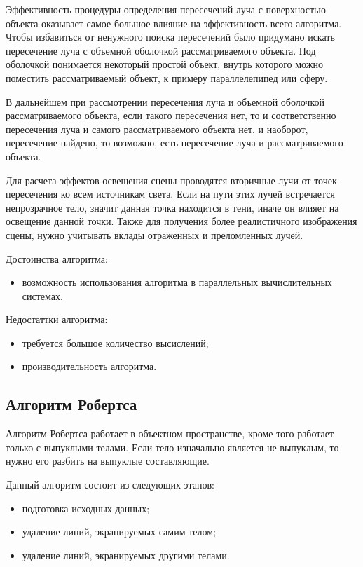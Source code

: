 Эффективность процедуры определения пересечений луча с поверхностью объекта оказывает самое большое влияние на эффективность всего алгоритма. Чтобы избавиться от ненужного поиска пересечений было придумано искать пересечение луча с объемной оболочкой рассматриваемого объекта. Под оболочкой понимается некоторый простой объект, внутрь которого можно поместить рассматриваемый объект, к примеру параллелепипед или сферу. 

В дальнейшем при рассмотрении пересечения луча и объемной оболочкой рассматриваемого объекта, если такого пересечения нет, то и соответственно пересечения луча и самого рассматриваемого объекта нет, и наоборот, пересечение найдено, то возможно, есть пересечение луча и рассматриваемого объекта. 

Для расчета эффектов освещения сцены проводятся вторичные лучи от точек пересечения ко всем источникам света. Если на пути этих лучей встречается непрозрачное тело, значит данная точка находится в тени, иначе он влияет на освещение данной точки. Также для получения более реалистичного изображения сцены, нужно учитывать вклады отраженных и преломленных лучей.

Достоинства алгоритма:
\begin{itemize}
	\item возможность использования алгоритма в параллельных вычислительных системах.
\end{itemize}

Недостаттки алгоритма:
\begin{itemize}
	\item требуется большое количество высислений;
	\item производительность алгоритма.
\end{itemize}

\subsection{Алгоритм Робертса}

Алгоритм Робертса работает в объектном пространстве, кроме того работает только с выпуклыми телами. Если тело изначально является не выпуклым, то нужно его разбить на выпуклые составляющие.

Данный алгоритм состоит из следующих этапов:
\begin{itemize}
	\item подготовка исходных данных;
	\item удаление линий, экранируемых самим телом;
	\item удаление линий, экранируемых другими телами.
\end{itemize}


